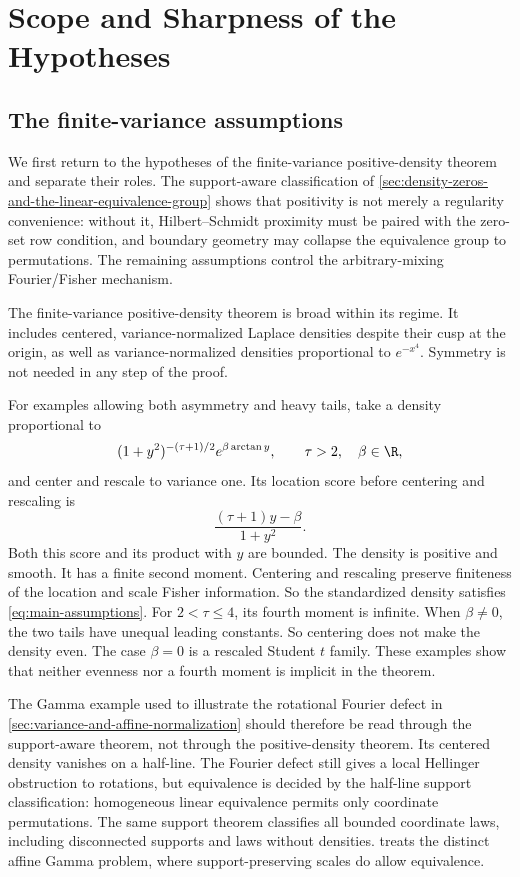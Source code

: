 \section{Scope and Sharpness of the Hypotheses}
\label{sec:scope-and-sharpness-of-the-hypotheses}

\subsection{The finite-variance assumptions}
\label{sec:finite-variance-assumptions}

We first return to the hypotheses of the finite-variance positive-density
theorem and separate their roles.
The support-aware classification of
\cref{sec:density-zeros-and-the-linear-equivalence-group} shows that
positivity is not merely a regularity convenience: without it,
Hilbert--Schmidt proximity must be paired with the zero-set row condition,
and boundary geometry may collapse the equivalence group to permutations.
The remaining assumptions control the arbitrary-mixing Fourier/Fisher
mechanism.

The finite-variance positive-density theorem is broad within its regime.
It includes centered, variance-normalized Laplace densities despite their
cusp at the origin, as well as variance-normalized densities proportional to
\(e^{-x^4}\).
Symmetry is not needed in any step of the proof.

For examples allowing both asymmetry and heavy tails, take a density
proportional to
\begin{equation}
 (1+y^2)^{-(\tau+1)/2}
                           e^{\beta\arctan y},
 \qquad \tau>2,\quad \beta\in\R,
 \label{eq:asymmetric-heavy-tail-example}
\end{equation}
and center and rescale to variance one.
Its location score before centering and rescaling is
\[
 \frac{(\tau+1)y-\beta}{1+y^2}.
\]
Both this score and its product with \(y\) are bounded.
The density is positive and smooth.
It has a finite second moment.
Centering and rescaling preserve finiteness of the location and scale
Fisher information.
So the standardized density satisfies \eqref{eq:main-assumptions}.
For \(2<\tau\le4\), its fourth moment is infinite.
When \(\beta\ne0\), the two tails have unequal leading constants.
So centering does not make the density even.
The case \(\beta=0\) is a rescaled Student \(t\) family.
These examples show that neither evenness nor a fourth moment is implicit in
the theorem.

The Gamma example used to illustrate the rotational Fourier defect in
\cref{sec:variance-and-affine-normalization} should therefore be read
through the support-aware theorem, not through the positive-density theorem.
Its centered density vanishes on a half-line.
The Fourier defect still gives a local Hellinger obstruction to rotations,
but equivalence is decided by the half-line support classification:
homogeneous linear equivalence permits only coordinate permutations.
The same support theorem classifies all bounded coordinate laws, including
disconnected supports and laws without densities.
 treats the distinct affine Gamma problem,
where support-preserving scales do allow equivalence.

